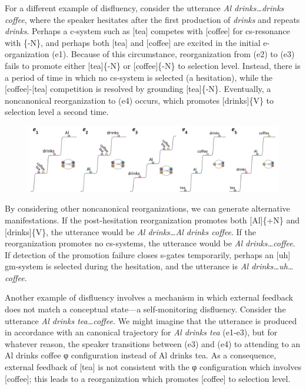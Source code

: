   For a different example of disfluency, consider the utterance \textit{Al drinks…drinks coffee}, where the speaker hesitates after the first production of \textit{drinks} and repeats \textit{drinks}. Perhaps a c-system such as [tea] competes with [coffee] for cs-resonance with \{-N\}, and perhaps both [tea] and [coffee] are excited in the initial e-organization (e1). Because of this circumstance, reorganization from (e2) to (e3) fails to promote either [tea]\{-N\} or [coffee]\{-N\} to selection level. Instead, there is a period of time in which no cs-system is selected (a hesitation), while the [coffee]-[tea] competition is resolved by grounding [tea]\{-N\}. Eventually, a noncanonical reorganization to (e4) occurs, which promotes [drinks]\{V\} to selection level a second time. 

  
\begin{figure}
\includegraphics[width=\textwidth]{figures/Tilsen-img61.png}
\caption{\missingcaption}
\label{fig:4:11}
\end{figure}
 

  By considering other noncanonical reorganizations, we can generate alternative manifestations. If the post-hesitation reorganization promotes both [Al]\{+N\} and [drinks]\{V\}, the utterance would be \textit{Al drinks…Al drinks coffee}. If the reorganization promotes no cs-systems, the utterance would be \textit{Al drinks…coffee}. If detection of the promotion failure closes s-gates temporarily, perhaps an [uh] gm-system is selected during the hesitation, and the utterance is \textit{Al drinks…uh…coffee}.

  Another example of disfluency involves a mechanism in which external feedback does not match a conceptual state—a self-monitoring disfluency. Consider the utterance \textit{Al drinks tea…coffee.} We might imagine that the utterance is produced in accordance with an canonical trajectory for \textit{Al drinks tea} (e1-e3), but for whatever reason, the speaker transitions between (e3) and (e4) to attending to an {\textbar}Al drinks coffee{\textbar} φ configuration instead of {\textbar}Al drinks tea{\textbar}. As a consequence, external feedback of [tea] is not consistent with the φ configuration which involves [coffee]; this leads to a reorganization which promotes [coffee] to selection level.

